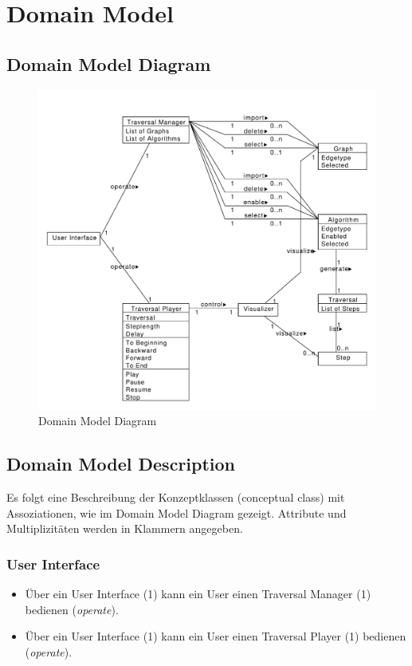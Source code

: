 \section{Domain Model}
\label{sec:Domain Model}
% 
\subsection{Domain Model Diagram}
\label{subsec:Domain Model Diagram}
\begin{figure}[H]
    \includegraphics[totalheight=0.55\textheight]{diagrams/domain-model-diagram.pdf}
    \caption{Domain Model Diagram}
    \label{fig:domain_model_diagram}
\end{figure}

\newpage
\subsection{Domain Model Description}
\label{subsec:Domain Model Description}
Es folgt eine Beschreibung der Konzeptklassen (conceptual class) mit Assoziationen, wie im Domain Model Diagram gezeigt. Attribute und Multiplizit\"aten werden in Klammern angegeben.

\subsubsection{User Interface}
\label{subsubsec:User Interface}
\begin{itemize}
  \item \"Uber ein User Interface (1) kann ein User einen Traversal Manager (1) bedienen (\textit{operate}).
  \item \"Uber ein User Interface (1) kann ein User einen Traversal Player (1) bedienen (\textit{operate}).
\end{itemize}
% 
